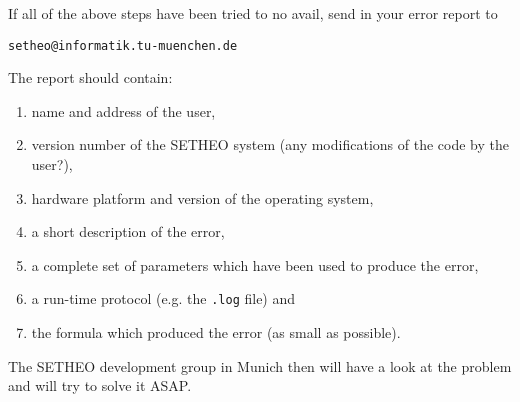 If all of the above steps have been tried to no avail,
send in your error report to
\begin{center}
{\tt setheo@informatik.tu-muenchen.de}
\end{center}
The report should contain:

\begin{enumerate}
\item
name and address of the user,
\item
version number of the SETHEO system (any modifications of the
code by the user?),
\item
hardware platform and version of the operating system,
\item
a short description of the error,
\item
a complete set of parameters which have been used to produce the
error,
\item
a run-time protocol (e.g. the {\tt .log} file) and
\item
the formula which produced the error (as small as possible).
\end{enumerate}

The SETHEO development group in Munich then will have a look at the
problem and will try to solve it ASAP.
